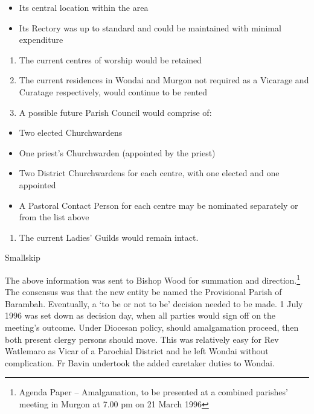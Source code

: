 \begin{itemize}
\item
  Its central location within the area
\item
  Its Rectory was up to standard and could be maintained with minimal expenditure
\end{itemize}

\begin{enumerate}
\def\labelenumi{\arabic{enumi}.}
\setcounter{enumi}{2}
\item
  The current centres of worship would be retained
\item
  The current residences in Wondai and Murgon not required as a Vicarage and Curatage respectively, would continue to be rented
\item
  A possible future Parish Council would comprise of:
\end{enumerate}

\begin{itemize}
\item
  Two elected Churchwardens
\item
  One priest's Churchwarden (appointed by the priest)
\item
  Two District Churchwardens for each centre, with one elected and one appointed
\item
  A Pastoral Contact Person for each centre may be nominated separately or from the list above
\end{itemize}

\begin{enumerate}
\def\labelenumi{\arabic{enumi}.}
\setcounter{enumi}{5}
\item
  The current Ladies' Guilds would remain intact.
\end{enumerate}

Smallskip

The above information was sent to Bishop Wood for summation and direction.\footnote{Agenda Paper -- Amalgamation, to be presented at a combined parishes' meeting in Murgon at 7.00 pm on 21 March 1996} The consensus was that the new entity be named the Provisional Parish of Barambah. Eventually, a `to be or not to be' decision needed to be made. 1 July 1996 was set down as decision day, when all parties would sign off on the meeting's outcome. Under Diocesan policy, should amalgamation proceed, then both present clergy persons should move. This was relatively easy for Rev Watlemaro as Vicar of a Parochial District and he left Wondai without complication. Fr Bavin undertook the added caretaker duties to Wondai.

